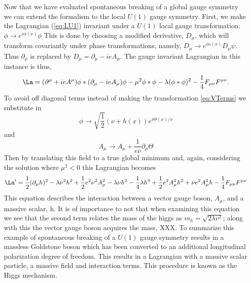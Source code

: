 Now that we have evaluated spontaneous breaking of 
a global gauge symmetry we can extend the formalism to the local $U(1)$ gauge symmetry.
First, we make the Lagrangian (\ref{eq:LU1}) invariant under a $U(1)$ 
local gauge transformation: $\phi\rightarrow e^{i\alpha(x)}\phi$
This is done by choosing a modified derivative, $D_{\mu}$, which will
transform covariantly under phase transformations, namely, 
$D_{\mu}\rightarrow e^{i\alpha(x)}D_{\mu}\psi$. Thus $\partial_{\mu}$
is replaced by $D_{\mu} = \partial_{\mu}-ieA_{\mu}$.
The gauge invariant Lagrangian in this instance is thus,
\begin{equation}
\La=(\partial^{\mu}+ieA^{\mu})\phi*(\partial_{\mu}-ieA_{\mu})\phi - \mu^{2} \phi*\phi - \lambda(\phi*\phi)^{2}-\frac{1}{4}F_{\mu\nu}F^{\mu\nu}.
\end{equation}
To avoid off diagonal terms instead of making the transformation \ref{eq:VTerms} 
we substitute in
\begin{equation}
\phi\rightarrow\sqrt{\frac{1}{2}}(\nu+h(x))e^{i\Theta(x)/\nu}
\end{equation}
and%
\begin{equation}
A_{\mu}\rightarrow A_{\mu}+\frac{1}{e\nu}\partial_{\mu}\Theta
\end{equation}
Then by translating this field to a true global minimum
and, again, considering the solution where $\mu^{2}<0$ this Lagrangian becomes 
\begin{equation}
\La'=\frac{1}{2}(\partial_{\mu}h)^{2}-\lambda \nu^{2}h^{2}+\frac{1}{2}e^{2}\nu^{2}A_{\mu}^{2}-\lambda\nu h^{3}-
\frac{1}{4}\lambda h^{4} + \frac{1}{2}e^{2}A_{\mu}^{2}h^{2}+\nu e^{2}A_{\mu}^{2}h-\frac{1}{4}F_{\mu\nu}F^{\mu\nu}
\end{equation}
This equation describes the interaction between a vector gauge boson,
$A_{\mu}$, and a massive scalar, h. 
It is of importance to not that when examining this equation 
we see that the second term relates the mass 
of the higgs as $m_{h}=\sqrt{2\lambda v^{2}}$; along with this
the vector gauge boson acquires the mass, XXX.%
To summarize this example of spontaneous breaking of a $U(1)$ gauge symmetry
results in a massless Goldstone boson which has been converted to an
additional longitudinal polarization degree of freedom. This results
in a Lagrangian with a massive scalar particle, a massive field and interaction terms.
This procedure is known as the Higgs mechanism. 

